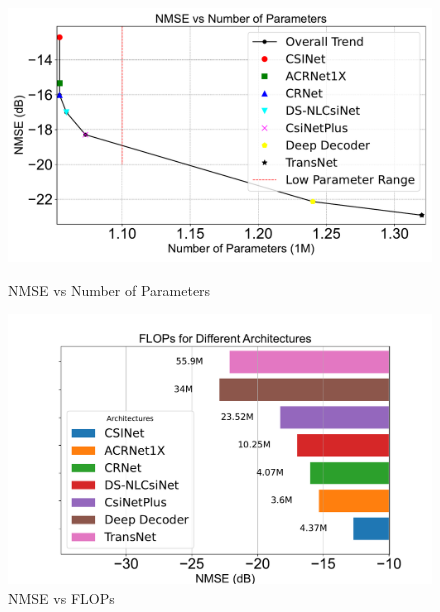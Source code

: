 \documentclass[lettersize,journal]{IEEEtran}
\begin{document}


\begin{figure}[!t] %
	\centering
	\begin{minipage}[b]{0.45\textwidth} %
		\centering
		\includegraphics[width=\textwidth]{NMSEvsNofparametters.pdf}
		\caption{NMSE vs Number of Parameters}
		\label{fig:nmse-params}
	\end{minipage}
	\hfill
	\begin{minipage}[b]{0.4\textwidth} %
		\centering
		\includegraphics[width=\textwidth]{NMSEvsFLOPs.pdf}
		\caption{NMSE vs FLOPs}
		\label{fig:nmse-flops}
	\end{minipage}
\end{figure}
\end{document}

